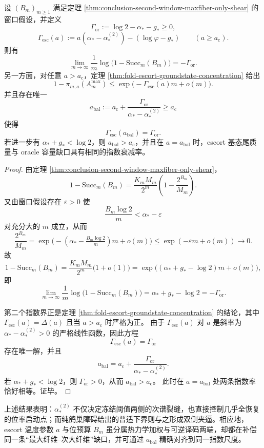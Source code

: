 \begin{theorem}\label{thm:conclusion-freezing-temperature-bit-budget-balance}
设 \((B_m)_{m\ge 1}\) 满足定理
\ref{thm:conclusion-second-window-maxfiber-only-shear}
的窗口假设，并定义
\[
\Gamma_{\mathrm{or}}
:=
\log 2-\alpha_\ast-g_\ast\ge 0,
\]
\[
\Gamma_{\mathrm{esc}}(a)
:=
a(\alpha_\ast-\alpha_\ast^{(2)})-(\log\varphi-g_\ast)
\qquad (a\ge a_{\mathrm c}).
\]
则有
\[
\lim_{m\to\infty}\frac1m\log\bigl(1-\mathrm{Succ}_m(B_m)\bigr)
=
-\Gamma_{\mathrm{or}}.
\]
另一方面，对任意 \(a>a_{\mathrm c}\)，定理
\ref{thm:fold-escort-groundstate-concentration}
给出
\[
1-\pi_{m,a}(A_m^{\max})
\le
\exp\!\bigl(-\Gamma_{\mathrm{esc}}(a)m+o(m)\bigr).
\]
并且存在唯一
\[
a_{\mathrm{bal}}
:=
a_{\mathrm c}
+
\frac{\Gamma_{\mathrm{or}}}{\alpha_\ast-\alpha_\ast^{(2)}}
\ge a_{\mathrm c}
\]
使得
\[
\Gamma_{\mathrm{esc}}(a_{\mathrm{bal}})=\Gamma_{\mathrm{or}}.
\]
若进一步有 \(\alpha_\ast+g_\ast<\log 2\)，则 \(a_{\mathrm{bal}}>a_{\mathrm c}\)，并且在 \(a=a_{\mathrm{bal}}\) 时，escort 基态尾质量与 oracle 容量缺口具有相同的指数衰减率。
\end{theorem}
\begin{proof}
由定理 \ref{thm:conclusion-second-window-maxfiber-only-shear}，
\[
1-\mathrm{Succ}_m(B_m)
=
\frac{K_mM_m}{2^m}\left(1-\frac{2^{B_m}}{M_m}\right).
\]
又由窗口假设存在 \(\varepsilon>0\) 使
\[
\frac{B_m\log 2}{m}<\alpha_\ast-\varepsilon
\]
对充分大的 \(m\) 成立，从而
\[
\frac{2^{B_m}}{M_m}
=
\exp\!\bigl(-(\alpha_\ast-\tfrac{B_m\log 2}{m})m+o(m)\bigr)
\le
\exp(-\varepsilon m+o(m))
\to 0.
\]
故
\[
1-\mathrm{Succ}_m(B_m)
=
\frac{K_mM_m}{2^m}\bigl(1+o(1)\bigr)
=
\exp\!\bigl((\alpha_\ast+g_\ast-\log 2)m+o(m)\bigr),
\]
即
\[
\lim_{m\to\infty}\frac1m\log\bigl(1-\mathrm{Succ}_m(B_m)\bigr)
=
\alpha_\ast+g_\ast-\log 2
=
-\Gamma_{\mathrm{or}}.
\]

第二个指数界正是定理 \ref{thm:fold-escort-groundstate-concentration} 的结论，其中
\(
\Gamma_{\mathrm{esc}}(a)=\Delta(a)
\)
且当 \(a>a_{\mathrm c}\) 时严格为正。
由于 \(\Gamma_{\mathrm{esc}}(a)\) 对 \(a\) 是斜率为
\(
\alpha_\ast-\alpha_\ast^{(2)}>0
\)
的严格线性函数，因此方程
\[
\Gamma_{\mathrm{esc}}(a)=\Gamma_{\mathrm{or}}
\]
存在唯一解，并且
\[
a_{\mathrm{bal}}
=
a_{\mathrm c}
+
\frac{\Gamma_{\mathrm{or}}}{\alpha_\ast-\alpha_\ast^{(2)}}.
\]
若 \(\alpha_\ast+g_\ast<\log 2\)，则 \(\Gamma_{\mathrm{or}}>0\)，从而 \(a_{\mathrm{bal}}>a_{\mathrm c}\)。
此时在 \(a=a_{\mathrm{bal}}\) 处两条指数率恰好相等。证毕。
\end{proof}

上述结果表明：\(\alpha_\ast^{(2)}\) 不仅决定冻结阈值两侧的次谱裂缝，也直接控制几乎全恢复的位率启动点；而纯鸽巢障碍给出的普适下界则与之形成双侧夹逼。相应地，escort 温度参数 \(a\) 与位预算 \(B_m\) 虽分属热力学加权与可逆译码两端，却都在补偿同一条“最大纤维--次大纤维”缺口，并可通过 \(a_{\mathrm{bal}}\) 精确对齐到同一指数尺度。

\endinput
